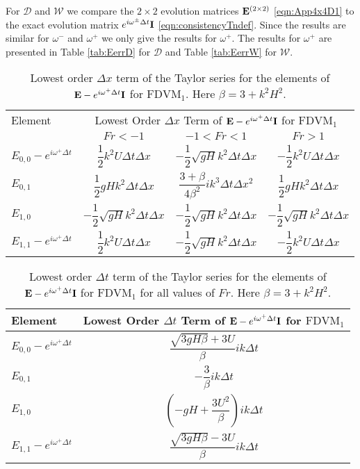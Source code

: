 For $\mathcal{D}$ and $\mathcal{W}$ we compare the $2\times 2$ evolution matrices $\mathbf{E}^{\left(2\times 2\right)}$ \eqref{eqn:App4x4D1} to the exact evolution matrix $e^{i\omega^\pm \Delta t } \mathbf{I}$ \eqref{eqn:consistencyTndef}. Since the results are similar for $\omega^-$ and $\omega^+$ we only give the results for $\omega^+$. The results for $\omega^+$ are presented in Table \ref{tab:EerrD} for $\mathcal{D}$ and Table \ref{tab:EerrW} for $\mathcal{W}$.

\begin{table}
	\centering
	\begin{tabular}{l c c c}
		\hline
		Element & \multicolumn{3}{c}{Lowest Order $\Delta x$ Term of $\mathbf{E} - e^{i \omega^+ \Delta t} \mathbf{I}$ for $\text{FDVM}_1$} \T \B \\ 
		\cline{2-4}
		& $Fr < -1$& $-1 < Fr < 1$ & $Fr > 1$ \T \B \\ 
		\hline
		$E_{0,0} -  e^{i \omega^+ \Delta t} $& $ \dfrac{1}{2} k^2 U \Delta t \Delta x$& $ - \dfrac{1}{2} \sqrt{gH} k^2 \Delta t\Delta x$ &$- \dfrac{1}{2} k^2 U \Delta t \Delta x$\T \B \\
		$E_{0,1}$& $\dfrac{1}{2}gHk^2 \Delta t \Delta x $&$ \dfrac{3 + \beta}{4 \beta^2}i k^3\Delta  t\Delta x^2$ & $\dfrac{1}{2}gHk^2 \Delta t \Delta x $ \T \B \\
		$E_{1,0}$& $ - \dfrac{1}{2} \sqrt{gH} k^2 \Delta t\Delta x$&$ - \dfrac{1}{2} \sqrt{gH} k^2 \Delta t\Delta x$ & $ - \dfrac{1}{2} \sqrt{gH} k^2 \Delta t\Delta x$ \T \B  \\
		$E_{1,1} -  e^{i \omega^+ \Delta t}$& $ \dfrac{1}{2} k^2 U \Delta t \Delta x$&$ - \dfrac{1}{2} \sqrt{gH} k^2 \Delta t\Delta x$ & $- \dfrac{1}{2} k^2 U \Delta t \Delta x$  \T\B  \\
		\hline
	\end{tabular}
	\caption{Lowest order $\Delta x$ term of the Taylor series for the elements of $\mathbf{E} - e^{i \omega^+ \Delta t} \mathbf{I}$ for $\text{FDVM}_1$. Here $\beta = 3 + k^2 H^2$.}
	\label{tab:EerrFDVM1dxerror} 
\end{table}
\begin{table}
	\centering
	\begin{tabular}{l c}
		\hline 
		Element & \multicolumn{1}{c}{Lowest Order $\Delta t$ Term of $\mathbf{E} - e^{i \omega^+ \Delta t} \mathbf{I}$ for $\text{FDVM}_1$}\T\B \\
		\hline 
		$E_{0,0} -  e^{i \omega^+ \Delta t} $ & $\dfrac{\sqrt{3gH \beta} + 3U}{\beta} ik \Delta t$ \T \B \\
		$E_{0,1}$&$ - \dfrac{3}{\beta} ik\Delta t$ \T \B \\
		$E_{1,0}$& $ \left(-gH + \dfrac{3U^2}{\beta}\right)ik \Delta t$ \T \B  \\
		$E_{1,1} -  e^{i \omega^+ \Delta t}$& $\dfrac{\sqrt{3gH \beta} - 3U}{\beta} ik \Delta t$ \T \B  \\
		\hline
	\end{tabular}
	\caption{Lowest order $\Delta t$ term of the Taylor series for the elements of $\mathbf{E} - e^{i \omega^+ \Delta t} \mathbf{I}$ for $\text{FDVM}_1$ for all values of $Fr$. Here $\beta = 3 + k^2 H^2$.}
	\label{tab:EerrFDVM1dterror} 
\end{table}
